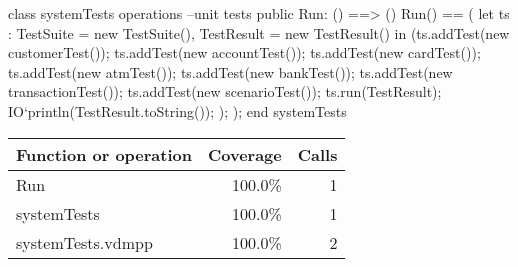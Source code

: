 \documentclass[a4paper]{article}
\begin{document}
\title{}
\author{}
\begin{vdm_al}

class systemTests
 operations
    --unit tests
    public Run: () ==> ()
    Run() == (
        let ts : TestSuite = new TestSuite(),
        TestResult = new TestResult()
        in (ts.addTest(new customerTest());
            ts.addTest(new accountTest());
            ts.addTest(new cardTest());
            ts.addTest(new atmTest());
            ts.addTest(new bankTest());
            ts.addTest(new transactionTest());
            ts.addTest(new scenarioTest());
            ts.run(TestResult);
            IO`println(TestResult.toString());
        );
    );
end systemTests
\end{vdm_al}
\bigskip
\begin{longtable}{|l|r|r|}
\hline
Function or operation & Coverage & Calls \\
\hline
\hline
Run & 100.0\% & 1 \\
\hline
systemTests & 100.0\% & 1 \\
\hline
\hline
systemTests.vdmpp & 100.0\% & 2 \\
\hline
\end{longtable}
\end{document}
